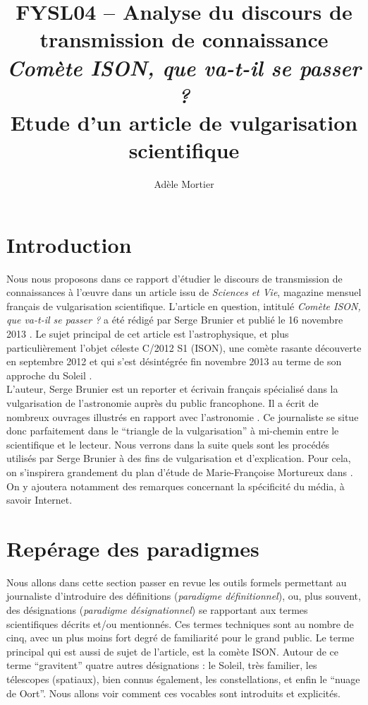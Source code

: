 \documentclass[a4paper,10pt]{article}
\title{FYSL04 -- Analyse du discours de transmission de connaissance\\
	\textit{Comète ISON, que va-t-il se passer ?}\\ \vspace{0.3cm}
	\small Etude d'un article de vulgarisation scientifique}
\author{Adèle Mortier}
\begin{document}
\maketitle
\nocite{*}
\tableofcontents

\section*{Introduction} \label{intro}
	Nous nous proposons dans ce rapport d'étudier le discours de transmission de connaissances à l'œuvre dans un article issu de \textit{Sciences et Vie}, magazine mensuel français de vulgarisation scientifique. L'article en question, intitulé \textit{Comète ISON, que va-t-il se passer ?} a été rédigé par Serge Brunier et publié le 16 novembre 2013 \cite{Brunier2013b}. Le sujet principal de cet article est l'astrophysique, et plus particulièrement l'objet céleste C/2012 S1 (ISON), une comète rasante découverte en septembre 2012 et qui s'est désintégrée fin novembre 2013 au terme de son approche du Soleil \cite{ISON}.\\
	L'auteur, Serge Brunier est un reporter et écrivain français spécialisé dans la vulgarisation de l'astronomie auprès du public francophone. Il a écrit de nombreux ouvrages illustrés en rapport avec l'astronomie \cite{SB}. Ce journaliste se situe donc parfaitement dans le ``triangle de la vulgarisation'' \cite{Labarthe1965} à mi-chemin entre le scientifique et le lecteur. Nous verrons dans la suite quels sont les procédés utilisés par Serge Brunier à des fins de vulgarisation et d'explication. Pour cela, on s'inspirera grandement du plan d'étude de Marie-Françoise Mortureux dans \cite{Mortureux1993}. On y ajoutera notamment des remarques concernant la spécificité du média, à savoir Internet.

\section{Repérage des paradigmes} \label{reperage}
	Nous allons dans cette section passer en revue les outils formels permettant au journaliste d'introduire des définitions (\textit{paradigme définitionnel}), ou, plus souvent, des désignations (\textit{paradigme désignationnel}) se rapportant aux termes scientifiques décrits et/ou mentionnés. Ces termes techniques sont au nombre de cinq, avec un plus moins fort degré de familiarité pour le grand public. Le terme principal qui est aussi de sujet de l'article, est la comète ISON. Autour de ce terme ``gravitent'' quatre autres désignations : le Soleil, très familier, les télescopes (spatiaux), bien connus également, les constellations, et enfin le ``nuage de Oort''. Nous allons voir comment ces vocables sont introduits et explicités. 
\end{document}
